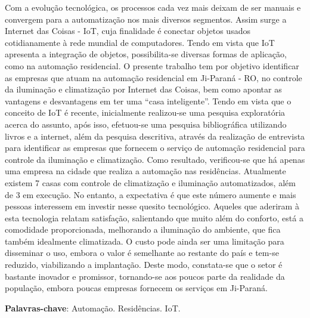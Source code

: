 \documentclass[article,12pt,onesidea,4paper,english,brazil]{abntex2}
\begin{document}
	\noindent Com a evolução tecnológica, os processos cada vez mais deixam de ser manuais e
	convergem para a automatização nos mais diversos segmentos. Assim surge a
	Internet das Coisas - IoT, cuja finalidade é conectar objetos usados cotidianamente à
	rede mundial de computadores. Tendo em vista que IoT apresenta a integração de
	objetos, possibilita-se diversas formas de aplicação, como na automação residencial.
	O presente trabalho tem por objetivo identificar as empresas que atuam na
	automação residencial em Ji-Paraná - RO, no controle da iluminação e climatização
	por Internet das Coisas, bem como apontar as vantagens e desvantagens em ter
	uma “casa inteligente”. Tendo em vista que o conceito de IoT é recente, inicialmente
	realizou-se uma pesquisa exploratória acerca do assunto, após isso, efetuou-se uma
	pesquisa bibliográfica utilizando livros e a internet, além da pesquisa descritiva,
	através da realização de entrevista para identificar as empresas que fornecem o
	serviço de automação residencial para controle da iluminação e climatização. Como
	resultado, verificou-se que há apenas uma empresa na cidade que realiza a
	automação nas residências. Atualmente existem 7 casas com controle de
	climatização e iluminação automatizados, além de 3 em execução. No entanto, a
	expectativa é que este número aumente e mais pessoas interessem em investir
	nesse quesito tecnológico. Aqueles que aderiram à esta tecnologia relatam
	satisfação, salientando que muito além do conforto, está a comodidade
	proporcionada, melhorando a iluminação do ambiente, que fica também idealmente
	climatizada. O custo pode ainda ser uma limitação para disseminar o uso, embora o
	valor é semelhante ao restante do país e tem-se reduzido, viabilizando a
	implantação. Deste modo, constata-se que o setor é bastante inovador e promissor,
	tornando-se aos poucos parte da realidade da população, embora poucas empresas
	fornecem os serviços em Ji-Paraná.
	\vspace{\onelineskip}
	
	\noindent
	\textbf{Palavras-chave}: Automação. Residências. IoT.
	
\end{document}
